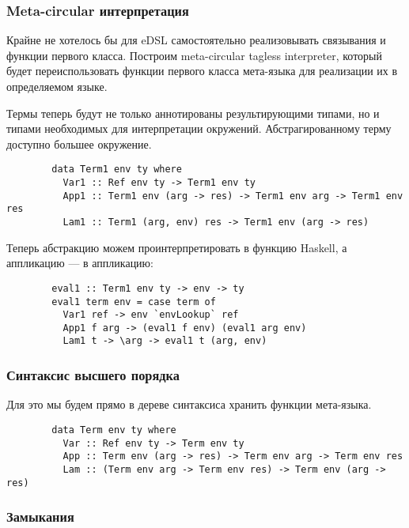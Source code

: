 \documentclass[12pt]{article}
\begin{document}
    \subsubsection{Meta-circular интерпретация}

    Крайне не хотелось бы для eDSL самостоятельно реализовывать связывания и функции первого класса.
    Построим meta-circular tagless interpreter, который будет переиспользовать функции первого класса мета-языка для реализации их в определяемом языке.

    Термы теперь будут не только аннотированы результирующими типами, но и типами необходимых для интерпретации окружений.
    Абстрагированному терму доступно большее окружение.

    \begin{verbatim}
        data Term1 env ty where
          Var1 :: Ref env ty -> Term1 env ty
          App1 :: Term1 env (arg -> res) -> Term1 env arg -> Term1 env res
          Lam1 :: Term1 (arg, env) res -> Term1 env (arg -> res)
    \end{verbatim}

    Теперь абстракцию можем проинтерпретировать в функцию Haskell, а аппликацию --- в аппликацию:
    \begin{verbatim}
        eval1 :: Term1 env ty -> env -> ty
        eval1 term env = case term of
          Var1 ref -> env `envLookup` ref
          App1 f arg -> (eval1 f env) (eval1 arg env)
          Lam1 t -> \arg -> eval1 t (arg, env)
    \end{verbatim}

    \subsubsection{Синтаксис высшего порядка}


    Для это мы будем прямо в дереве синтаксиса хранить функции мета-языка.

    \begin{verbatim}
        data Term env ty where
          Var :: Ref env ty -> Term env ty
          App :: Term env (arg -> res) -> Term env arg -> Term env res
          Lam :: (Term env arg -> Term env res) -> Term env (arg -> res)
    \end{verbatim}





    \subsubsection{Замыкания} \label{subsubsec:closures}
\end{document}
